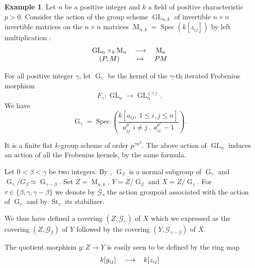 \documentclass{amsart}
\theoremstyle{definition}
\newtheorem{exam}{Example}[section]
\theoremstyle{remark}
\begin{document}
\begin{exam}

Let $n$ be a positive integer and $k$ a field of positive characteristic $p>0$. Consider the action of the group scheme $\operatorname{GL}_{n,k}$ of invertible $n \times n$ invertible matrices on the $n \times n$ matrices $\operatorname{M}_{n,k} = \operatorname{Spec}(k[z_{ij}])$ by left multiplication : 
\[ \begin{tabular}{ccc}
$\operatorname{GL}_n \times_k \operatorname{M}_n$ & ${\longrightarrow}$ & $\operatorname{M}_n$ \\ 

$(P,M)$ & $\mapsto$ & $PM$ \\ 

\end{tabular} \]
   

For all positive integer $\gamma$, let $\operatorname{G}_\gamma$ be the kernel of the $\gamma$-th iterated Frobenius morphism \[ F_\gamma : \operatorname{GL}_n {\longrightarrow} \operatorname{GL}_n^{(\gamma)}. \]
We have \[ \operatorname{G}_\gamma = \operatorname{Spec} \left( \frac{k[a_{ij}, \ 1 \leq i,j \leq n]}{a_{ij}^{p^\gamma} \ i \neq j \ , \ a_{ii}^{p^\gamma} -1} \right). \] 

It is a finite flat $k$-group scheme of order $p^{\gamma n^2}$. The above action of $\operatorname{GL}_n$ induces an action of all the Frobenius kernels, by the same formula.

Let $0< \beta < \gamma$ be two integers. By \cite[I, \S 9.4-9.5]{Jantzen}, $\operatorname{G}_\beta$ is a normal subgroup of $\operatorname{G}_\gamma$ and $\operatorname{G}_\gamma/G_\beta \simeq \operatorname{G}_{\gamma-\beta}$. Set $Z = \operatorname{M}_{n,k}$, $Y = Z/\operatorname{G}_\beta$ and $X=Z/\operatorname{G}_\gamma$. For $\tau \in \{\beta,\gamma,\gamma-\beta\}$ we denote by ${{\mathcal G}}_\tau$ the action groupoid associated with the action of $\operatorname{G}_\tau$ and by $\operatorname{St}_\tau$ its stabilizer.  

We thus have defined a covering $(Z,{{\mathcal G}}_\gamma)$ of $X$ which we expressed as the covering $(Z,{{\mathcal G}}_\beta)$ of $Y$ followed by the covering $(Y,{{\mathcal G}}_{\gamma-\beta})$ of $X$.

The quotient morphism $g : Z {\longrightarrow} Y$ is easily seen to be defined by the ring map \[ \begin{tabular}{ccc}

$k[y_{ij}]$ & ${\longrightarrow}$ & $k[z_{ij}]$ \\ 


\end{tabular}\]
\end{exam}
\end{document}
